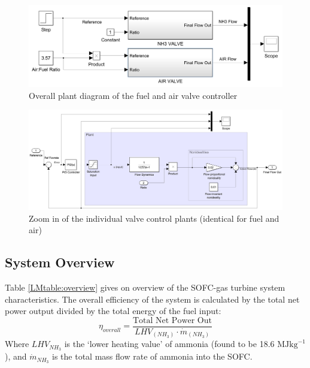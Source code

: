 \begin{figure}[h]
    \centering
    \includegraphics[scale=0.25]{controlleroverall.png}
    \caption{Overall plant diagram of the fuel and air valve controller}
    \label{LMfig:controller}
\end{figure}

\begin{landscape}
\begin{figure}[p]
    \centering
    \includegraphics[scale=0.8]{valvecontroller.png}
    \caption{Zoom in of the individual valve control plants (identical for fuel and air)}
    \label{LMfig:valveplant}
\end{figure}
\end{landscape}

\subsection{System Overview}
Table \ref{LMtable:overview} gives on overview of the SOFC-gas turbine system characteristics. The overall efficiency of the system is calculated by the total net power output divided by the total energy of the fuel input:
\begin{equation}
\eta_{overall}=  \frac{\text{Total Net Power Out}}{LHV_{(NH_{3})} \cdot \dot{m}_{(NH_3)}}		
\end{equation}
Where $LHV_{NH_3}$ is the `lower heating value' of ammonia (found to be 18.6 $\text{MJkg}^{-1}$ \cite{LM25}), and $\dot{m}_{NH_3}$ is the total mass flow rate of ammonia into the SOFC.\\
\hspace{1cm}\\



